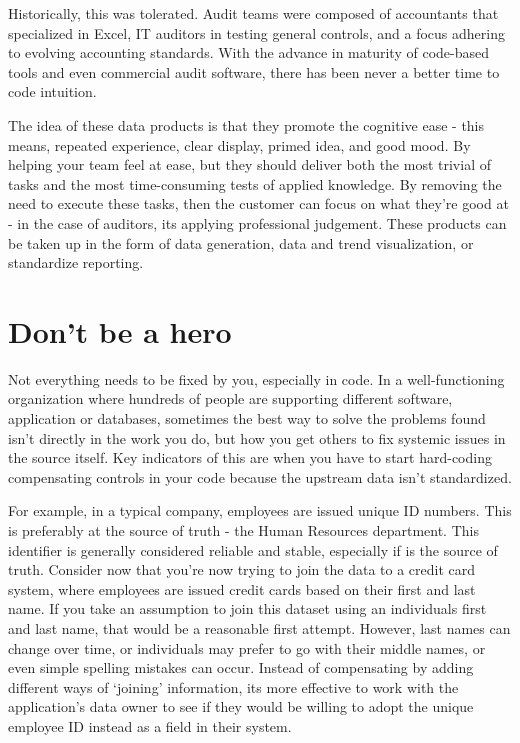 \documentclass[
]{book}
\begin{document}
Historically, this was tolerated. Audit teams were composed of accountants that specialized in Excel, IT auditors in testing general controls, and a focus adhering to evolving accounting standards. With the advance in maturity of code-based tools and even commercial audit software, there has been never a better time to code intuition.

The idea of these data products is that they promote the cognitive ease - this means, repeated experience, clear display, primed idea, and good mood.\citep{cognitive-ease} By helping your team feel at ease, but they should deliver both the most trivial of tasks and the most time-consuming tests of applied knowledge. By removing the need to execute these tasks, then the customer can focus on what they're good at - in the case of auditors, its applying professional judgement. These products can be taken up in the form of data generation, data and trend visualization, or standardize reporting.

\hypertarget{dont-be-a-hero}{%
\section{Don't be a hero}\label{dont-be-a-hero}}

Not everything needs to be fixed by you, especially in code. In a well-functioning organization where hundreds of people are supporting different software, application or databases, sometimes the best way to solve the problems found isn't directly in the work you do, but how you get others to fix systemic issues in the source itself. Key indicators of this are when you have to start hard-coding compensating controls in your code because the upstream data isn't standardized.

For example, in a typical company, employees are issued unique ID numbers. This is preferably at the source of truth - the Human Resources department. This identifier is generally considered reliable and stable, especially if is the source of truth. Consider now that you're now trying to join the data to a credit card system, where employees are issued credit cards based on their first and last name. If you take an assumption to join this dataset using an individuals first and last name, that would be a reasonable first attempt. However, last names can change over time, or individuals may prefer to go with their middle names, or even simple spelling mistakes can occur. Instead of compensating by adding different ways of `joining' information, its more effective to work with the application's data owner to see if they would be willing to adopt the unique employee ID instead as a field in their system.
\end{document}
